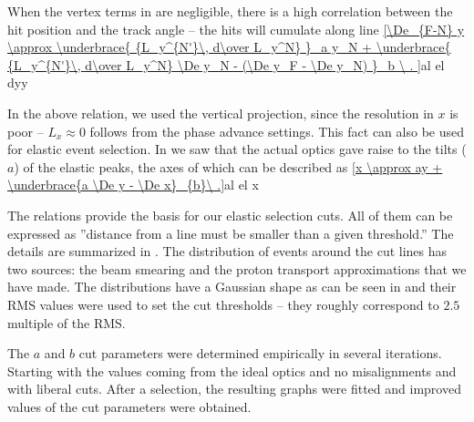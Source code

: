 When the vertex terms in  are negligible, there is a high correlation between the hit position and the track angle -- the hits will cumulate along line
\eqref{\De_{F-N} y \approx
\underbrace{ {L_y^{N'}\, d\over L_y^N} }_a y_N 
+ \underbrace{ {L_y^{N'}\, d\over L_y^N} \De y_N - (\De y_F - \De y_N) }_b \ .
}{al el dyy}

In the above relation, we used the vertical projection, since the resolution in $x$ is poor -- $L_x\approx 0$ follows from the phase advance settings. This fact can also be used for elastic event selection. In  we saw that the actual optics gave raise to the tilts ($a$) of the elastic peaks, the axes of which can be described as
\eqref{x \approx ay + \underbrace{a \De y - \De x}_{b}\ .}{al el x} 



The relations  provide the basis for our elastic selection cuts. All of them can be expressed as ''distance from a line must be smaller than a given threshold.'' The details are summarized in . The distribution of events around the cut lines has two sources: the beam smearing and the proton transport approximations that we have made. The distributions have a Gaussian shape as can be seen in  and their RMS values were used to set the cut thresholds -- they roughly correspond to $2.5$ multiple of the RMS.

The $a$ and $b$ cut parameters were determined empirically in several iterations. Starting with the values coming from the ideal optics and no misalignments and with liberal cuts. After a selection, the resulting graphs were fitted and improved values of the cut parameters were obtained.


